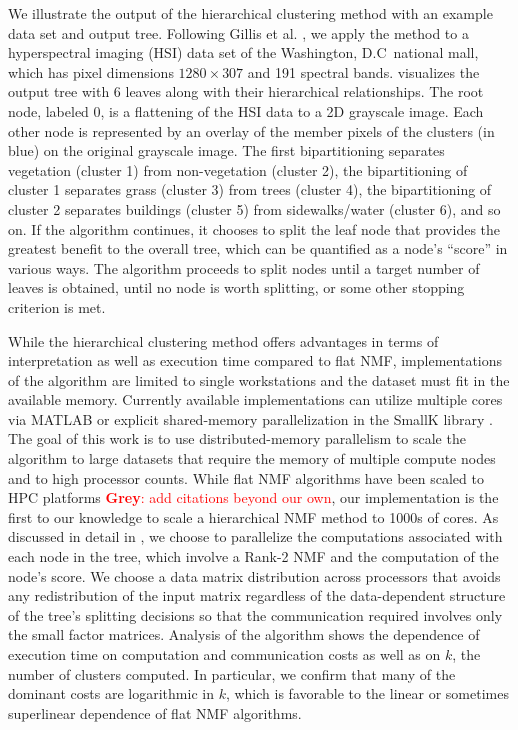 \documentclass[conference,compsoc]{IEEEtran}
\newcommand{\GB}[1]{\textcolor{red}{\textbf{Grey}: #1}}
\begin{document}
We illustrate the output of the hierarchical clustering method with an example data set and output tree.
Following Gillis et al. \cite{GKP15}, we apply the method to a hyperspectral imaging (HSI) data set of the Washington, D.C~national mall, which has pixel dimensions $1280 \times 307$ and 191 spectral bands.
 visualizes the output tree with 6 leaves along with their hierarchical relationships.
The root node, labeled 0, is a flattening of the HSI data to a 2D grayscale image.
Each other node is represented by an overlay of the member pixels of the clusters (in blue) on the original grayscale image.
The first bipartitioning separates vegetation (cluster 1) from non-vegetation (cluster 2), the bipartitioning of cluster 1 separates grass (cluster 3) from trees (cluster 4), the bipartitioning of cluster 2 separates buildings (cluster 5) from sidewalks/water (cluster 6), and so on.
If the algorithm continues, it chooses to split the leaf node that provides the greatest benefit to the overall tree, which can be quantified as a node's ``score'' in various ways.
The algorithm proceeds to split nodes until a target number of leaves is obtained, until no node is worth splitting, or some other stopping criterion is met.

While the hierarchical clustering method offers advantages in terms of interpretation as well as execution time compared to flat NMF, implementations of the algorithm are limited to single workstations and the dataset must fit in the available memory.
Currently available implementations can utilize multiple cores via MATLAB \cite{KP13} or explicit shared-memory parallelization in the SmallK library \cite{SmallK}.
The goal of this work is to use distributed-memory parallelism to scale the algorithm to large datasets that require the memory of multiple compute nodes and to high processor counts.
While flat NMF algorithms have been scaled to HPC platforms \cite{} \GB{add citations beyond our own}, our implementation is the first to our knowledge to scale a hierarchical NMF method to 1000s of cores. 
As discussed in detail in , we choose to parallelize the computations associated with each node in the tree, which involve a Rank-2 NMF and the computation of the node's score.
We choose a data matrix distribution across processors that avoids any redistribution of the input matrix regardless of the data-dependent structure of the tree's splitting decisions so that the communication required involves only the small factor matrices.
Analysis of the algorithm shows the dependence of execution time on computation and communication costs as well as on $k$, the number of clusters computed.
In particular, we confirm that many of the dominant costs are logarithmic in $k$, which is favorable to the linear or sometimes superlinear dependence of flat NMF algorithms.
\end{document}
